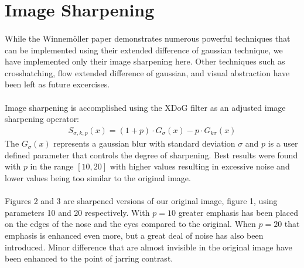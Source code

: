 \documentclass[10pt,twocolumn]{article}
\begin{document}
\section{Image Sharpening}
	\paragraph{} While the Winnem{\"o}ller paper demonstrates numerous powerful techniques that can be implemented using their extended difference of gaussian technique, we have implemented only their image sharpening here.  Other techniques such as crosshatching, flow extended difference of gaussian, and visual abstraction\cite{Winnemoeller:2012:XED} have been left as future excercises.
	\paragraph{} Image sharpening is accomplished using the XDoG filter as an adjusted image sharpening operator:
\begin{align}
	S_{\sigma, k, p}(x) = (1+p)\cdot G_{\sigma} (x) - p \cdot G_{k\sigma} (x)
\end{align}
The $G_{\sigma} (x)$ represents a gaussian blur with standard deviation $\sigma$ and $p$ is a user defined parameter that controls the degree of sharpening.  Best results were found with $p$ in the range $[10, 20]$ with higher values resulting in excessive noise and lower values being too similar to the original image.
	\paragraph{} Figures 2 and 3 are sharpened versions of our original image, figure 1, using parameters 10 and 20 respectively.  With $p = 10$ greater emphasis has been placed on the edges of the nose and the eyes compared to the original.  When $p=20$ that emphasis is enhanced even more, but a great deal of noise has also been introduced.  Minor difference that are almost invisible in the original image have been enhanced to the point of jarring contrast.
\end{document}
